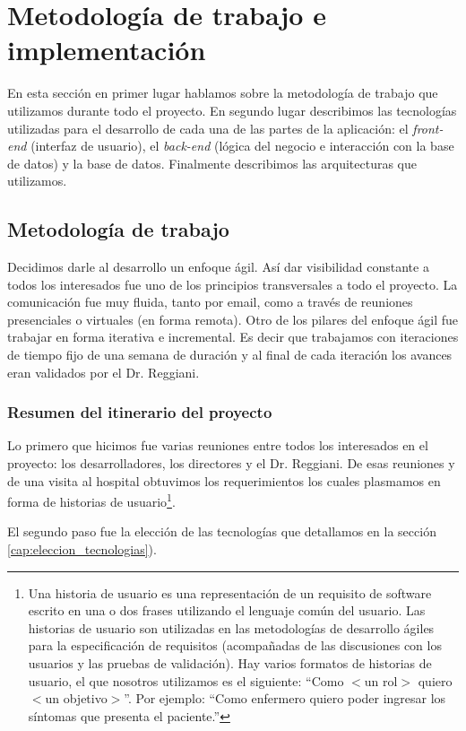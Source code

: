 \section{Metodología de trabajo e implementación}
En esta sección en primer lugar hablamos sobre la metodología de trabajo que utilizamos durante todo el proyecto. En segundo lugar describimos las tecnologías utilizadas para el desarrollo de cada una de las partes de la aplicación: el \textit{front-end} (interfaz de usuario), el \textit{back-end} (lógica del negocio e interacción con la base de datos) y la base de datos. Finalmente describimos las arquitecturas que utilizamos.

\subsection{Metodología de trabajo}
Decidimos darle al desarrollo un enfoque ágil\cite{Shore}. Así dar visibilidad constante a todos los interesados fue uno de los principios transversales a todo el proyecto. La comunicación fue muy fluida, tanto por email, como a través de reuniones presenciales o virtuales (en forma remota). Otro de los pilares del enfoque ágil fue trabajar en forma iterativa e incremental. Es decir que trabajamos con iteraciones de tiempo fijo de una semana de duración y al final de cada iteración los avances eran validados por el Dr. Reggiani.

\subsubsection{Resumen del itinerario del proyecto}\label{cap:itinerario}
Lo primero que hicimos fue varias reuniones entre todos los interesados en el proyecto: los desarrolladores, los directores y el Dr. Reggiani. De esas reuniones y de una visita al hospital obtuvimos los requerimientos los cuales plasmamos en forma de historias de usuario\footnote{Una historia de usuario es una representación de un requisito de software escrito en una o dos frases utilizando el lenguaje común del usuario. Las historias de usuario son utilizadas en las metodologías de desarrollo ágiles para la especificación de requisitos (acompañadas de las discusiones con los usuarios y las pruebas de validación). Hay varios formatos de historias de usuario, el que nosotros utilizamos es el siguiente: ``Como  $<$un rol$>$ quiero $<$un objetivo$>$''. Por ejemplo: ``Como enfermero quiero poder ingresar los síntomas que presenta el paciente.''}.

El segundo paso fue la elección de las tecnologías que detallamos en la sección \ref{cap:eleccion_tecnologias}).

